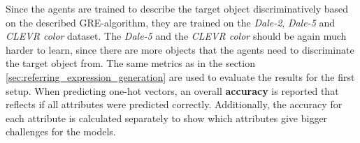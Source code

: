Since the agents are trained to describe the target object discriminatively based on the described GRE-algorithm, they are trained on the \emph{Dale-2}, \emph{Dale-5} and \emph{CLEVR color} dataset.
The \emph{Dale-5} and the \emph{CLEVR color} should be again much harder to learn, since there are more objects that the agents need to discriminate the target object from.
The same metrics as in the section \ref{sec:referring_expression_generation} are used to evaluate the results for the first setup.
When predicting one-hot vectors, an overall \textbf{accuracy} is reported that reflects if all attributes were predicted correctly.
Additionally, the accuracy for each attribute is calculated separately to show which attributes give bigger challenges for the models.

